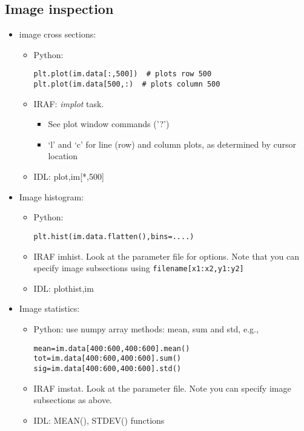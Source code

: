 \documentclass[12pt]{article}
\begin{document}
\subsection*{Image inspection}
\begin{itemize}
\item image cross sections:
    \begin{itemize}
        \item Python:
            \begin{verbatim}
plt.plot(im.data[:,500])  # plots row 500
plt.plot(im.data[500,:)  # plots column 500
            \end{verbatim}
        \item IRAF: \emph{implot} task.
            \begin{itemize}
                \item See plot window commands ('?')
                \item `l' and `c' for line (row) and column plots,
                    as determined by cursor location
            \end{itemize}
        \item IDL: plot,im[*,500]
    \end{itemize}

\item Image histogram:
    \begin{itemize}
        \item Python:
            \begin{verbatim}
plt.hist(im.data.flatten(),bins=....)
            \end{verbatim}
        \item IRAF imhist. Look at the parameter file for options. Note that you
            can specify image subsections using
            \texttt{filename[x1:x2,y1:y2]}
        \item IDL: plothist,im
    \end{itemize}

\item Image statistics:
    \begin{itemize}
        \item Python: use numpy array methods: mean, sum and std, e.g.,
            \begin{verbatim}
mean=im.data[400:600,400:600].mean()
tot=im.data[400:600,400:600].sum()
sig=im.data[400:600,400:600].std()
            \end{verbatim}
        \item IRAF imstat. Look at the parameter file. Note you can specify
            image subsections as above.
        \item IDL: MEAN(), STDEV() functions
\end{itemize}


\end{itemize}
\end{document}
